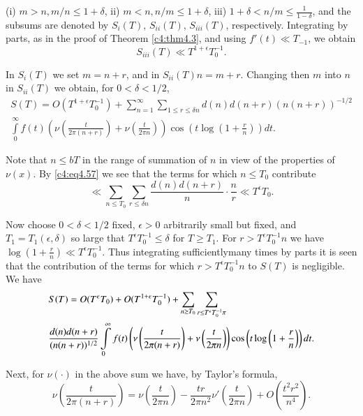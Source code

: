 (i) $m > n, m/n \leq 1+ \delta$, ii) $m < n, n/m \leq 1+ \delta$, iii)
$1+ \delta < n/m \leq \frac{1}{1- \delta}$, and the subsums are
denoted by $S_i(T)$, $S_{ii}(T)$, $S_{iii}(T)$,
respectively. Integrating by parts, as in the proof of Theorem
\ref{c4:thm4.3}, and using $f'(t) \ll T_{-1}$, we obtain
$$
S_{iii} (T) \ll T^{1+\epsilon} T^{-1}_0.
$$

In $S_i (T)$ we set $m=n +r$, and in $S_{ii}(T) n = m+r$. Changing
then $m$ into $n$ in $S_{ii}(T)$ we obtain, for $0< \delta < 1/2$, 
\begin{multline*}
  S(T) = O \left(T^{1+ \epsilon}T^{-1}_0\right) + \sum^\infty_{n=1} \sum_{1 \leq
    r \leq \delta n} d(n) d(n+r) (n (n+r))^{-1/2}\\
  \int\limits_0^\infty f(t) \left(\nu \left(\frac{t}{2\pi (n+r)} \right) +
  \nu \left(\frac{t}{2 \pi n}\right) \right) \cos \left(t \log
  \left(1+ \frac{r}{n} \right) \right)dt.
\end{multline*}

Note that $n \leq bT$ in the range of summation of $n$ in view of the
properties of $\nu(x)$. By \eqref{c4:eq4.57} we see that the terms for
which $n \leq T_0$ contribute
$$
\ll \sum_{n \leq T_0} \sum_{r \leq \delta n} \frac{d(n)d(n+r)}{n}\cdot
\frac{n}{r} \ll T^\epsilon T_0.
$$

Now choose $0 < \delta < 1/2$ fixed, $\epsilon > 0$ arbitrarily small
but fixed, and $T_1= T_1 (\epsilon, \delta)$ so large that
$T^{\epsilon}T^{-1}_0 \leq \delta$ for $T \geq T_1$. For $r >
T^\epsilon T^{-1}_0 n$ we have $\log \left(1+ \frac{r}{n} \right) \ll
T^\epsilon T^{-1}_0$. Thus integrating sufficiently\pageoriginale many
times by parts it is seen that the contribution of the terms for which
$r > T^{\epsilon} T^{-1}_0 n$ to $S(T)$ is negligible. We have
\begin{align}
&  S(T) = O (T^\epsilon T_0) + O(T^{1+ \epsilon}T^{-1}_0) +
  \sum_{n \geq T_0} \sum_{r \leq T^\epsilon T^{-1}_0
    \pi}\hspace{2cm} \label{c4:eq4.81}\\
& \frac{d(n) d(n+r)}{(n (n+r))^{1/2}} \int\limits_0^\infty f(t)
  \left(\nu \left(\frac{t}{2\pi (n+r)} \right)+ \nu \left(\frac{t}{2
    \pi n} \right) \right)  \cos \left(t \log \left(1+ \frac{r}{n}
  \right)\right)dt.\notag 
\end{align}

Next, for $\nu (\cdot)$ in the above sum we have, by Taylor's formula, 
$$
\nu \left(\frac{t}{2\pi (n+r)} \right) = \nu \left(\frac{t}{2 \pi n}
\right) - \frac{tr}{2 \pi n^2} \nu' \left(\frac{t}{2 \pi n} \right) +
O\left(\frac{t^2 r^2}{n^4} \right).
$$

